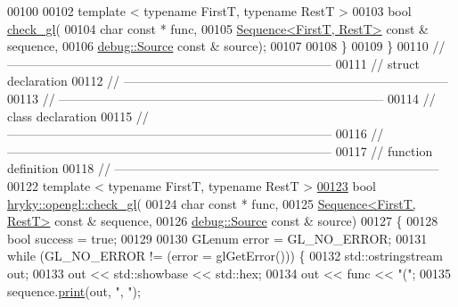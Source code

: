 \begin{DoxyCode}
00100     
00102     \textcolor{keyword}{template} < \textcolor{keyword}{typename} FirstT, \textcolor{keyword}{typename} RestT >
00103     \textcolor{keywordtype}{bool} \hyperlink{namespacehryky_1_1opengl_a068d66e76fc06a43c45d3c8da7a75ce5}{check_gl}(
00104         \textcolor{keywordtype}{char} \textcolor{keyword}{const} * func,
00105         \hyperlink{classhryky_1_1_sequence}{Sequence<FirstT, RestT>} \textcolor{keyword}{const} & sequence,
00106         \hyperlink{classhryky_1_1debug_1_1_source}{debug::Source} \textcolor{keyword}{const} & source);
00107 
00108 \}
00109 \}
00110 \textcolor{comment}{//
      ------------------------------------------------------------------------------}
00111 \textcolor{comment}{// struct declaration}
00112 \textcolor{comment}{//
      ------------------------------------------------------------------------------}
00113 \textcolor{comment}{//
      ------------------------------------------------------------------------------}
00114 \textcolor{comment}{// class declaration}
00115 \textcolor{comment}{//
      ------------------------------------------------------------------------------}
00116 \textcolor{comment}{//
      ------------------------------------------------------------------------------}
00117 \textcolor{comment}{// function definition}
00118 \textcolor{comment}{//
      ------------------------------------------------------------------------------}
00122 \textcolor{comment}{}\textcolor{keyword}{template} < \textcolor{keyword}{typename} FirstT, \textcolor{keyword}{typename} RestT >
\hypertarget{opengl__common_8h_source_l00123}{}\hyperlink{namespacehryky_1_1opengl_a068d66e76fc06a43c45d3c8da7a75ce5}{00123} \textcolor{keywordtype}{bool} \hyperlink{namespacehryky_1_1opengl_a068d66e76fc06a43c45d3c8da7a75ce5}{hryky::opengl::check_gl}(
00124     \textcolor{keywordtype}{char} \textcolor{keyword}{const} * func,
00125     \hyperlink{classhryky_1_1_sequence}{Sequence<FirstT, RestT>} \textcolor{keyword}{const} & sequence,
00126     \hyperlink{classhryky_1_1debug_1_1_source}{debug::Source} \textcolor{keyword}{const} & source)
00127 \{
00128     \textcolor{keywordtype}{bool} success = \textcolor{keyword}{true};
00129     
00130     GLenum error = GL\_NO\_ERROR;
00131     \textcolor{keywordflow}{while} (GL\_NO\_ERROR != (error = glGetError())) \{
00132         std::ostringstream out;
00133         out << std::showbase << std::hex;
00134         out << func << \textcolor{stringliteral}{"("};
00135         sequence.\hyperlink{classhryky_1_1_sequence_a8443de2eb918764c345a86b40dd888db}{print}(out, \textcolor{stringliteral}{", "});

\end{DoxyCode}
